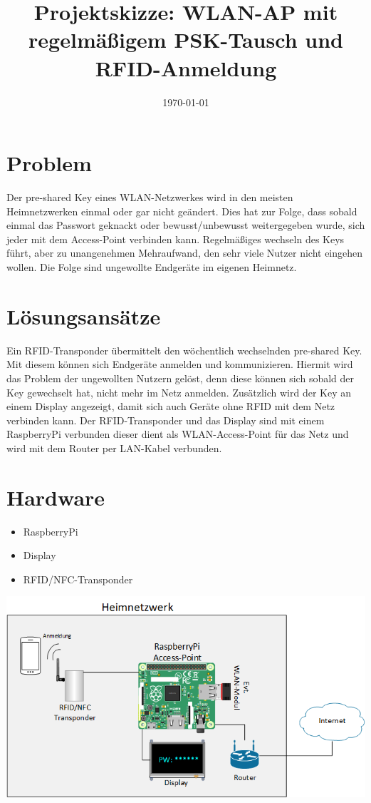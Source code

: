 \documentclass[a4paper]{article}
\title{Projektskizze: WLAN-AP mit regelmäßigem PSK-Tausch und RFID-Anmeldung}
\date{\today}
\begin{document}
	\maketitle
	
	
	\section{Problem}
	Der pre-shared Key eines WLAN-Netzwerkes wird in den meisten Heimnetzwerken einmal oder gar nicht geändert. Dies hat zur Folge, dass sobald einmal das Passwort geknackt oder bewusst/unbewusst weitergegeben wurde, sich jeder mit dem Access-Point verbinden kann. Regelmäßiges wechseln des Keys führt, aber zu unangenehmen Mehraufwand, den sehr viele Nutzer nicht eingehen wollen. Die Folge sind ungewollte Endgeräte im eigenen Heimnetz.
	
	\section{Lösungsansätze}
	Ein RFID-Transponder übermittelt den wöchentlich wechselnden pre-shared Key. Mit diesem können sich Endgeräte anmelden und kommunizieren. Hiermit wird das Problem der ungewollten Nutzern gelöst, denn diese können sich sobald der Key gewechselt hat, nicht mehr im Netz anmelden. Zusätzlich wird der Key an einem Display angezeigt, damit sich auch Geräte ohne RFID mit dem Netz verbinden kann. Der RFID-Transponder und das Display sind mit einem RaspberryPi verbunden dieser dient als WLAN-Access-Point für das Netz und wird mit dem Router per LAN-Kabel verbunden.
	
	\section{Hardware}
	
	\begin{itemize}
		\item RaspberryPi
		\item Display
		\item RFID/NFC-Transponder
	\end{itemize}

	\includegraphics[scale=0.6]{skizze}
\end{document}
